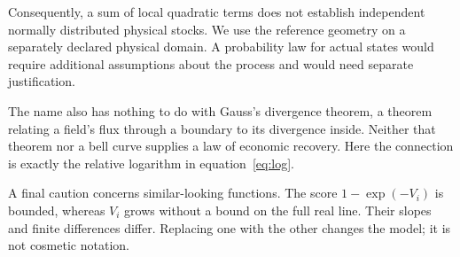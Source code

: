 Consequently, a sum of local quadratic terms does not establish independent normally distributed physical stocks. We use the reference geometry on a separately declared physical domain. A probability law for actual states would require additional assumptions about the process and would need separate justification.

The name also has nothing to do with Gauss's divergence theorem, a theorem relating a field's flux through a boundary to its divergence inside. Neither that theorem nor a bell curve supplies a law of economic recovery. Here the connection is exactly the relative logarithm in equation~\eqref{eq:log}.

A final caution concerns similar-looking functions. The score $1-\exp(-V_i)$ is bounded, whereas $V_i$ grows without a bound on the full real line. Their slopes and finite differences differ. Replacing one with the other changes the model; it is not cosmetic notation.



